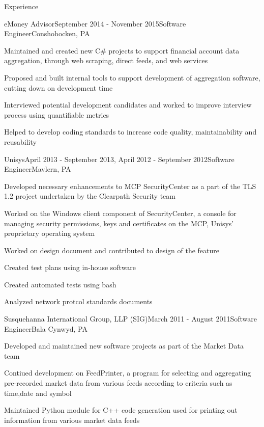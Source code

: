 \documentclass{resume} %
\begin{document}
\begin{rSection}{Experience}

\begin{rSubsection}{eMoney Advisor}{September 2014 - November 2015}{Software Engineer}{Conshohocken, PA}
\item Maintained and created new C\# projects to support financial account data aggregation, through web scraping, direct feeds, and web services
\item Proposed and built internal tools to support development of aggregation software, cutting down on development time
\item Interviewed potential development candidates and worked to improve interview process using quantifiable metrics
\item Helped to develop coding standards to increase code quality, maintainability and reusability
\end{rSubsection}


\begin{rSubsection}{Unisys}{April 2013 - September 2013, April 2012 - September 2012}{Software Engineer}{Mavlern, PA}
\item Developed necessary enhancements to MCP SecurityCenter as a part of the TLS 1.2 project undertaken by the Clearpath Security team
\item Worked on the Windows client component of SecurityCenter, a console for managing security permissions, keys and certificates on the MCP, Unisys’ proprietary operating system
\item Worked on design document and contributed to design of the feature
\item Created test plans using in-house software
\item Created automated tests using bash
\item Analyzed network protcol standards documents
\end{rSubsection}


\begin{rSubsection}{Susquehanna International Group, LLP (SIG)}{March 2011 - August 2011}{Software Engineer}{Bala Cynwyd, PA}
\item Developed and maintained new software projects as part of the Market Data team
\item Contiued development on FeedPrinter, a program for selecting and aggregating pre-recorded market data from various feeds according to criteria such as time,date and symbol
\item Maintained Python module for C++ code generation used for printing out information from various market data feeds\end{rSubsection}

\end{rSection}
\end{document}
